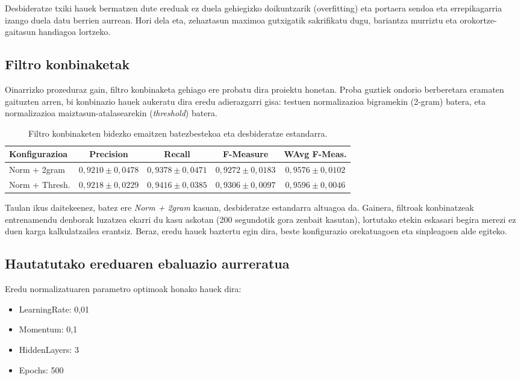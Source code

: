 \documentclass[12pt, a4paper]{article}
\begin{document}
Desbideratze txiki hauek bermatzen dute ereduak ez duela gehiegizko doikuntzarik (overfitting) eta portaera sendoa eta errepikagarria izango duela datu berrien aurrean. Hori dela eta, zehaztasun maximoa gutxigatik sakrifikatu dugu, bariantza murriztu eta orokortze-gaitasun handiagoa lortzeko.

\subsection{Filtro konbinaketak}

Oinarrizko prozeduraz gain, filtro konbinaketa gehiago ere probatu dira proiektu honetan. Proba guztiek ondorio berberetara eramaten gaituzten arren, bi konbinazio hauek aukeratu dira eredu adierazgarri gisa: testuen normalizazioa bigramekin (2-gram) batera, eta normalizazioa maiztasun-atalasearekin (\textit{threshold}) batera.

\begin{table}[htbp]
\centering
    \caption{Filtro konbinaketen bidezko emaitzen batezbestekoa eta desbideratze estandarra.}
\label{tab:filtro_konbinaketak}
\begin{tabular}{lcccc}
\hline
\textbf{Konfigurazioa} & \textbf{Precision} & \textbf{Recall} & \textbf{F-Measure} & \textbf{WAvg F-Meas.} \\ \hline
Norm + 2gram & $0{,}9210 \pm 0{,}0478$ & $0{,}9378 \pm 0{,}0471$ & $0{,}9272 \pm 0{,}0183$ & $0{,}9576 \pm 0{,}0102$ \\
Norm + Thresh. & $0{,}9218 \pm 0{,}0229$ & $0{,}9416 \pm 0{,}0385$ & $0{,}9306 \pm 0{,}0097$ & $0{,}9596 \pm 0{,}0046$ \\ \hline
\end{tabular}
\end{table}

\noindent
Taulan ikus daitekeenez, batez ere \textit{Norm + 2gram} kasuan, desbideratze estandarra altuagoa da. Gainera, filtroak konbinatzeak entrenamendu denborak luzatzea ekarri du kasu askotan (200 segundotik gora zenbait kasutan), lortutako etekin eskasari begira merezi ez duen karga kalkulatzailea erantsiz. Beraz, eredu hauek baztertu egin dira, beste konfigurazio orekatuagoen eta sinpleagoen alde egiteko.

\subsection{Hautatutako ereduaren ebaluazio aurreratua}

Eredu normalizatuaren parametro optimoak honako hauek dira:
\begin{itemize}
    \item LearningRate: 0,01
    \item Momentum: 0,1
    \item HiddenLayers: 3
    \item Epochs: 500
\end{itemize}
\end{document}
